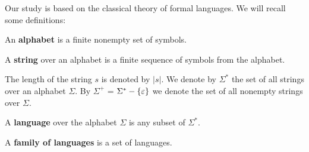 Our study is based on the classical theory of formal languages. We will recall some definitions:

\begin{definition}
An {\bf alphabet} is a finite nonempty set of symbols.
\end{definition}

\begin{definition}
A {\bf string} over an alphabet is a finite sequence of symbols from the alphabet.
\end{definition}

The length of the string $s$ is denoted by $|s|$. We denote by $\Sigma^*$ the set of all strings over an alphabet $\Sigma$. By $\Sigma^+$ = $\Sigma^* - \{\varepsilon\}$ we denote the set of all nonempty strings over $\Sigma$.

\begin{definition}
A {\bf language} over the alphabet $\Sigma$ is any subset of $\Sigma^*$.
\end{definition}

\begin{definition}
A {\bf family of languages} is a set of languages.
\end{definition}
